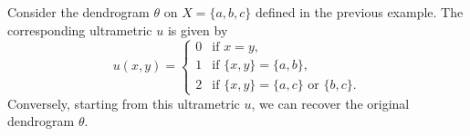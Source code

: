 \begin{example}
  Consider the dendrogram $\theta$ on $X=\{a,b,c\}$ defined in the previous example. The corresponding ultrametric $u$ is given by
  \[
  u(x,y) =
  \begin{cases}
    0 & \text{if } x=y,\\
    1 & \text{if } \{x,y\}=\{a,b\},\\
    2 & \text{if } \{x,y\}=\{a,c\}\text{ or }\{b,c\}.
  \end{cases}
  \]
  Conversely, starting from this ultrametric $u$, we can recover the original dendrogram $\theta$.
\end{example}









\newpage
